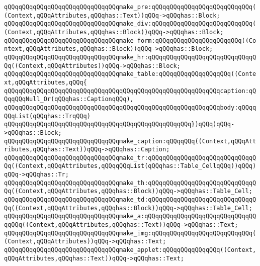\verb|qQQqqQQqqQQqqQQqqQQqqQQqqQQqqQQqmake_pre:qQQqqQQqqQQqqQQqqQQqqQQqqQQq((Context,qQQqAttributes,qQQqhas::Text))qQQq->qQQqhas::Block;|\newline
\verb|qQQqqQQqqQQqqQQqqQQqqQQqqQQqqQQqmake_div:qQQqqQQqqQQqqQQqqQQqqQQqqQQq((Context,qQQqAttributes,qQQqhas::Block))qQQq->qQQqhas::Block;|\newline
\verb|qQQqqQQqqQQqqQQqqQQqqQQqqQQqqQQqmake_form:qQQqqQQqqQQqqQQqqQQqqQQq((Context,qQQqAttributes,qQQqhas::Block))qQQq->qQQqhas::Block;|\newline
\verb|qQQqqQQqqQQqqQQqqQQqqQQqqQQqqQQqmake_hr:qQQqqQQqqQQqqQQqqQQqqQQqqQQqqQQq((Context,qQQqAttributes))qQQq->qQQqhas::Block;|\newline
\verb|qQQqqQQqqQQqqQQqqQQqqQQqqQQqqQQqmake_table:qQQqqQQqqQQqqQQqqQQq((Context,qQQqAttributes,qQQq{|\newline
\verb|qQQqqQQqqQQqqQQqqQQqqQQqqQQqqQQqqQQqqQQqqQQqqQQqqQQqqQQqqQQqcaption:qQQqqQQqNull_Or(qQQqhas::CaptionqQQq),|\newline
\verb|qQQqqQQqqQQqqQQqqQQqqQQqqQQqqQQqqQQqqQQqqQQqqQQqqQQqqQQqqQQqbody:qQQqqQQqList(qQQqhas::TrqQQq)|\newline
\verb|qQQqqQQqqQQqqQQqqQQqqQQqqQQqqQQqqQQqqQQqqQQqqQQqqQQq})qQQq)qQQq->qQQqhas::Block;|\newline
\verb|qQQqqQQqqQQqqQQqqQQqqQQqqQQqqQQqmake_caption:qQQqqQQq((Context,qQQqAttributes,qQQqhas::Text))qQQq->qQQqhas::Caption;|\newline
\verb|qQQqqQQqqQQqqQQqqQQqqQQqqQQqqQQqmake_tr:qQQqqQQqqQQqqQQqqQQqqQQqqQQqqQQq((Context,qQQqAttributes,qQQqqQQqList(qQQqhas::Table_CellqQQq))qQQq)qQQq->qQQqhas::Tr;|\newline
\verb|qQQqqQQqqQQqqQQqqQQqqQQqqQQqqQQqmake_th:qQQqqQQqqQQqqQQqqQQqqQQqqQQqqQQq((Context,qQQqAttributes,qQQqhas::Block))qQQq->qQQqhas::Table_Cell;|\newline
\verb|qQQqqQQqqQQqqQQqqQQqqQQqqQQqqQQqmake_td:qQQqqQQqqQQqqQQqqQQqqQQqqQQqqQQq((Context,qQQqAttributes,qQQqhas::Block))qQQq->qQQqhas::Table_Cell;|\newline
\verb|qQQqqQQqqQQqqQQqqQQqqQQqqQQqqQQqmake_a:qQQqqQQqqQQqqQQqqQQqqQQqqQQqqQQqqQQq((Context,qQQqAttributes,qQQqhas::Text))qQQq->qQQqhas::Text;|\newline
\verb|qQQqqQQqqQQqqQQqqQQqqQQqqQQqqQQqmake_img:qQQqqQQqqQQqqQQqqQQqqQQqqQQq((Context,qQQqAttributes))qQQq->qQQqhas::Text;|\newline
\verb|qQQqqQQqqQQqqQQqqQQqqQQqqQQqqQQqmake_applet:qQQqqQQqqQQqqQQq((Context,qQQqAttributes,qQQqhas::Text))qQQq->qQQqhas::Text;|\newline
